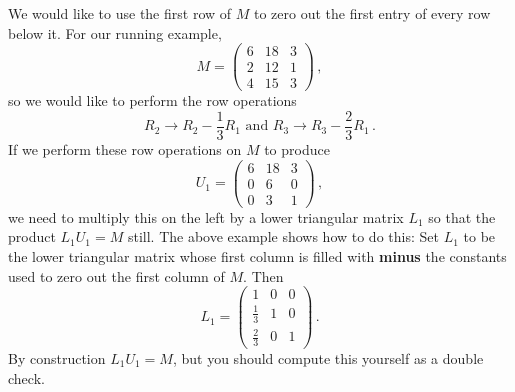 \vspace{2mm}
We would like to  use the first row of $M$ to zero out the first entry of every row below it.  For our running example, \[M=\begin{pmatrix}
6 & 18 & 3 \\
2 & 12 & 1 \\
4 & 15 & 3 
\end{pmatrix}\, ,\] so we would like to perform the row operations \[R_2\to R_2 -\frac 13 R_1 \mbox{ and } R_3\to R_3-\frac 23R_1\, .\]
If we perform these row operations on $M$ to produce 
\[U_1=\begin{pmatrix}
6 & 18 & 3 \\
0 & 6 & 0 \\
0 & 3 & 1 
\end{pmatrix}\, ,\]
we need to multiply this on the left by a lower triangular matrix $L_1$ so that the product $L_1U_1=M$ still.
The above example shows how to do this:
Set $L_1$ to be the lower triangular matrix whose first column is filled with  {\bfseries minus} the constants used to zero out the first column of $M$.  Then \[L_1 = \begin{pmatrix}
1 & 0 & 0 \\[1mm]
\frac{1}{3} & 1 & 0 \\[1mm]
\frac{2}{3} & 0 & 1 
\end{pmatrix}\, .\]  
By construction $L_1 U_1=M$, but you should compute this yourself as a double check.

